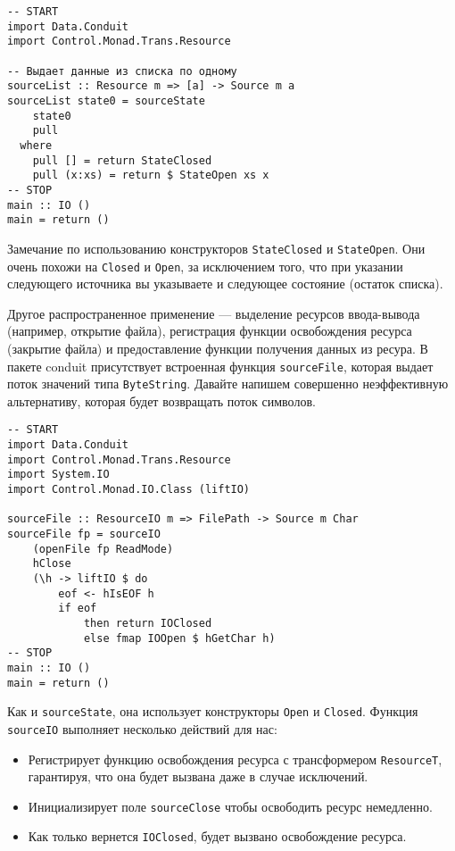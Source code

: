 \begin{lstlisting}
-- START
import Data.Conduit
import Control.Monad.Trans.Resource

-- Выдает данные из списка по одному
sourceList :: Resource m => [a] -> Source m a
sourceList state0 = sourceState
    state0
    pull
  where
    pull [] = return StateClosed
    pull (x:xs) = return $ StateOpen xs x
-- STOP
main :: IO ()
main = return ()
\end{lstlisting}

Замечание по использованию конструкторов \lstinline=StateClosed= и \lstinline=StateOpen=.
Они очень похожи на
\lstinline=Closed= и \lstinline=Open=, за исключением того, что при указании следующего
источника вы указываете и следующее состояние (остаток списка).

Другое распространенное применение --- выделение ресурсов ввода-вывода (например,
открытие файла), регистрация функции освобождения ресурса (закрытие файла) и
предоставление функции получения данных из ресура.
В пакете conduit присутствует встроенная функция \verb=sourceFile=, которая выдает поток
значений типа \lstinline=ByteString=. Давайте напишем совершенно неэффективную
альтернативу, которая будет возвращать поток символов.

\begin{lstlisting}
-- START
import Data.Conduit
import Control.Monad.Trans.Resource
import System.IO
import Control.Monad.IO.Class (liftIO)

sourceFile :: ResourceIO m => FilePath -> Source m Char
sourceFile fp = sourceIO
    (openFile fp ReadMode)
    hClose
    (\h -> liftIO $ do
        eof <- hIsEOF h
        if eof
            then return IOClosed
            else fmap IOOpen $ hGetChar h)
-- STOP
main :: IO ()
main = return ()
\end{lstlisting}

Как и \verb=sourceState=, она использует конструкторы \verb*|Open| и \verb*|Closed|.
Функция \lstinline=sourceIO= выполняет несколько действий для нас:
\begin{itemize}
 \item Регистрирует функцию освобождения ресурса с трансформером \lstinline=ResourceT=,
гарантируя, что она будет вызвана даже в случае исключений.
 \item Инициализирует поле \lstinline=sourceClose= чтобы освободить ресурс немедленно.
 \item Как только вернется \lstinline=IOClosed=, будет вызвано освобождение ресурса.
\end{itemize}
  
